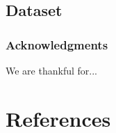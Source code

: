 \documentclass{article}
\begin{document}
\subsection{Dataset}

%
%

\subsubsection*{Acknowledgments}

We are thankful for...

\section*{References}
\small




%
%
\end{document}
